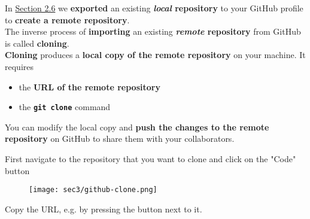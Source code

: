 \begin{frame}[fragile]
\emptyframetitle

  In \hyperlink{sec3.1}{Section 2.6} we \textbf{exported} an existing \textbf{\textit{local} repository} to your GitHub profile to \textbf{create a remote repository}.\\[0.35cm]

  The inverse process of \textbf{importing} an existing \textbf{\textit{remote} repository} from GitHub is called \textbf{cloning}.\\[0.35cm]

  \textbf{Cloning} produces a \textbf{local copy of the remote repository} on your machine. It requires 
  \begin{itemize}
    \item the \textbf{URL of the remote repository}
    \item the \textbf{\texttt{git clone}} command\\[0.35cm]
  \end{itemize}

  You can modify the local copy and \textbf{push the changes to the remote repository} on GitHub to share them with your collaborators. 
   
\end{frame}


\begin{frame}[fragile]
\emptyframetitle

  First navigate to the repository that you want to clone and click on the "Code" button

  \begin{figure}[h]
    \texttt{[image: sec3/github-clone.png]}
  \end{figure}

  Copy the URL, e.g. by pressing the button next to it.

\end{frame}


